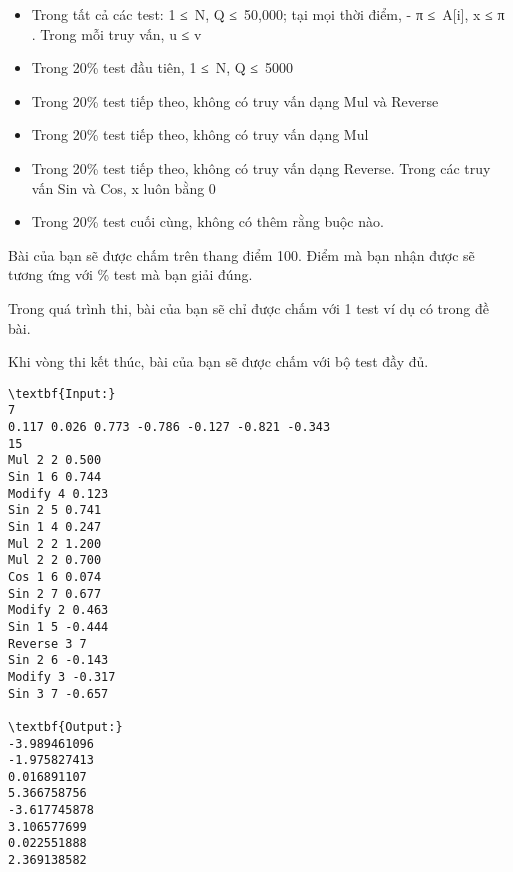 \begin{itemize}
	\item     Trong tất cả các test: 1 ≤ N, Q ≤ 50,000; tại mọi thời điểm, -         π        ≤ A[i], x ≤         π        . Trong mỗi truy vấn, u ≤ v   
	\item     Trong 20\% test đầu tiên, 1 ≤ N, Q ≤ 5000   
	\item     Trong 20\% test tiếp theo, không có truy vấn dạng Mul và Reverse   
	\item     Trong 20\% test tiếp theo, không có truy vấn dạng Mul   
	\item     Trong 20\% test tiếp theo, không có truy vấn dạng Reverse. Trong các truy vấn Sin và Cos, x luôn bằng 0   
	\item     Trong 20\% test cuối cùng, không có thêm rằng buộc nào.   
\end{itemize}
Bài của bạn sẽ được chấm trên thang điểm 100. Điểm mà bạn nhận được sẽ tương ứng với \% test mà bạn giải đúng.  

   Trong quá trình thi, bài của bạn sẽ chỉ được chấm với 1 test ví dụ có trong đề bài.  

   Khi vòng thi kết thúc, bài của bạn sẽ được chấm với bộ test đầy đủ.
\begin{verbatim}
\textbf{Input:}
7
0.117 0.026 0.773 -0.786 -0.127 -0.821 -0.343
15
Mul 2 2 0.500
Sin 1 6 0.744
Modify 4 0.123
Sin 2 5 0.741
Sin 1 4 0.247
Mul 2 2 1.200
Mul 2 2 0.700
Cos 1 6 0.074
Sin 2 7 0.677
Modify 2 0.463
Sin 1 5 -0.444
Reverse 3 7
Sin 2 6 -0.143
Modify 3 -0.317
Sin 3 7 -0.657

\textbf{Output:}
-3.989461096
-1.975827413
0.016891107
5.366758756
-3.617745878
3.106577699
0.022551888
2.369138582
\end{verbatim}